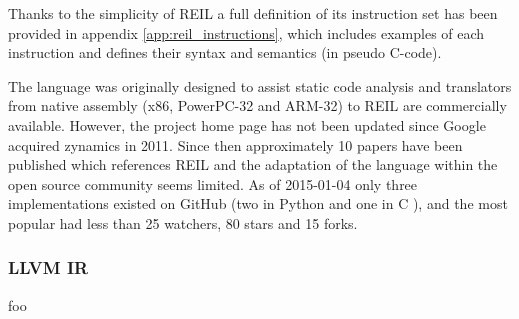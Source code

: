 
Thanks to the simplicity of REIL a full definition of its instruction set has been provided in appendix \ref{app:reil_instructions}, which includes examples of each instruction and defines their syntax and semantics (in pseudo C-code).


The language was originally designed to assist static code analysis and translators from native assembly (x86, PowerPC-32 and ARM-32) to REIL are commercially available. However, the project home page has not been updated since Google acquired zynamics in 2011. Since then approximately 10 papers have been published which references REIL and the adaptation of the language within the open source community seems limited. As of 2015-01-04 only three implementations existed on GitHub (two in Python \cite{barf,pyreil} and one in C \cite{bit}), and the most popular had less than 25 watchers, 80 stars and 15 forks.


\subsubsection{LLVM IR}




foo
